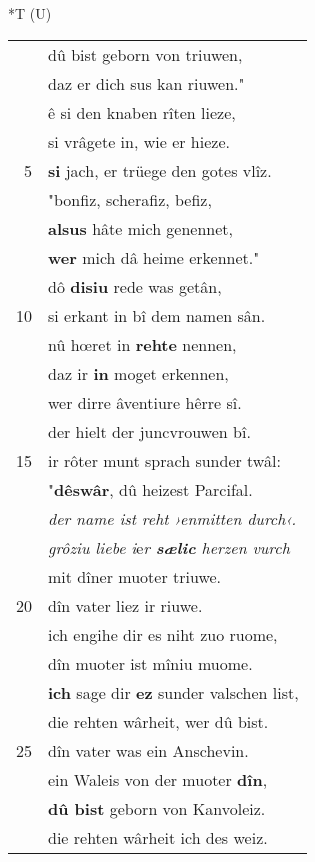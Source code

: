 \documentclass[8pt,a4paper,notitlepage]{article}
\begin{document}
\begin{table}[ht]
\begin{minipage}[t]{0.5\linewidth}
\end{minipage}
\hspace{0.5cm}
\begin{minipage}[t]{0.5\linewidth}
\small
\begin{center}*T (U)
\end{center}
\begin{tabular}{rl}
 & dû bist geborn von triuwen,\\ 
 & daz er dich sus kan riuwen."\\ 
 & ê si den knaben rîten lieze,\\ 
 & si vrâgete in, wie er hieze.\\ 
5 & \textbf{si} jach, er trüege den gotes vlîz.\\ 
 & "bonfiz, scherafiz, befiz,\\ 
 & \textbf{alsus} hâte mich genennet,\\ 
 & \textbf{wer} mich dâ heime erkennet."\\ 
 & dô \textbf{disiu} rede was getân,\\ 
10 & si erkant in bî dem namen sân.\\ 
 & nû hœret in \textbf{rehte} nennen,\\ 
 & daz ir \textbf{in} moget erkennen,\\ 
 & wer dirre âventiure hêrre sî.\\ 
 & der hielt der juncvrouwen bî.\\ 
15 & ir rôter munt sprach sunder twâl:\\ 
 & "\textbf{dêswâr}, dû heizest Parcifal.\\ 
 & \textit{der name ist reht ›enmitten durch‹.}\\ 
 & \textit{grôziu liebe i}e\textit{r \textbf{sælic} herzen vurch}\\ 
 & mit dîner muoter triuwe.\\ 
20 & dîn vater liez ir riuwe.\\ 
 & ich engihe dir es niht zuo ruome,\\ 
 & dîn muoter ist mîniu muome.\\ 
 & \textbf{ich} sage dir \textbf{ez} sunder valschen list,\\ 
 & die rehten wârheit, wer dû bist.\\ 
25 & dîn vater was ein Anschevin.\\ 
 & ein Waleis von der muoter \textbf{dîn},\\ 
 & \textbf{dû bist} geborn von Kanvoleiz.\\ 
 & die rehten wârheit ich des weiz.\\ 

\end{tabular}
\end{minipage}
\end{table}
\end{document}
